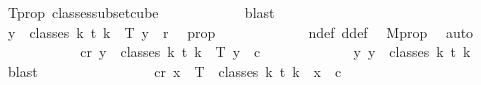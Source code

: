 \begin{isabellebody}
\ T{\isacharunderscore}{\kern0pt}prop\ classes{\isacharunderscore}{\kern0pt}subset{\isacharunderscore}{\kern0pt}cube\isanewline
\ \ \ \ \ \ \ \ \ \ \isamarkupfalse%
\ blast\isanewline
\ \ \ \ \ \ \ \ \isamarkupfalse%
\ \isamarkupfalse%
\ {\isachardoublequoteopen}{\isasymforall}y\ {\isasymin}\ classes\ {\isacharparenleft}{\kern0pt}k{\isacharplus}{\kern0pt}{}{\isacharparenright}{\kern0pt}\ t\ {\isacharparenleft}{\kern0pt}k{\isacharplus}{\kern0pt}{}{\isacharparenright}{\kern0pt}{\isachardot}{\kern0pt}\ {\isasymchi}\ {\isacharparenleft}{\kern0pt}T\ y{\isacharparenright}{\kern0pt}\ {\isacharless}{\kern0pt}\ r{\isachardoublequoteclose}\ \isamarkupfalse%
\ {\isasymchi}{\isacharunderscore}{\kern0pt}prop\ \isanewline
\ \ \ \ \ \ \ \ \ \ \isamarkupfalse%
\ n{\isacharunderscore}{\kern0pt}def\ d{\isacharunderscore}{\kern0pt}def\ \isamarkupfalse%
\ M{\isacharprime}{\kern0pt}{\isacharunderscore}{\kern0pt}prop\ \isamarkupfalse%
\ auto\ \isanewline
\ \ \ \ \ \ \ \ \isamarkupfalse%
\ \isamarkupfalse%
\ {\isachardoublequoteopen}{\isasymexists}c{\isacharless}{\kern0pt}r{\isachardot}{\kern0pt}\ {\isasymforall}y\ {\isasymin}\ classes\ {\isacharparenleft}{\kern0pt}k{\isacharplus}{\kern0pt}{}{\isacharparenright}{\kern0pt}\ t\ {\isacharparenleft}{\kern0pt}k{\isacharplus}{\kern0pt}{}{\isacharparenright}{\kern0pt}{\isachardot}{\kern0pt}\ {\isasymchi}\ {\isacharparenleft}{\kern0pt}T\ y{\isacharparenright}{\kern0pt}\ {\isacharequal}{\kern0pt}\ c{\isachardoublequoteclose}\ \isanewline
\ \ \ \ \ \ \ \ \ \ \isamarkupfalse%
\ {\isacartoucheopen}{\isasymexists}{\isacharbang}{\kern0pt}y{\isachardot}{\kern0pt}\ y\ {\isasymin}\ classes\ {\isacharparenleft}{\kern0pt}k{\isacharplus}{\kern0pt}{}{\isacharparenright}{\kern0pt}\ t\ {\isacharparenleft}{\kern0pt}k{\isacharplus}{\kern0pt}{}{\isacharparenright}{\kern0pt}{\isacartoucheclose}\ \isamarkupfalse%
\ blast\isanewline
\ \ \ \ \ \ \isamarkupfalse%
\isanewline
\ \ \ \ \ \ \isamarkupfalse%
\ \isamarkupfalse%
\ {\isachardoublequoteopen}{\isasymexists}c{\isacharless}{\kern0pt}r{\isachardot}{\kern0pt}\ {\isasymforall}x\ {\isasymin}\ T\ {\isacharbackquote}{\kern0pt}\ classes\ {\isacharparenleft}{\kern0pt}k{\isacharplus}{\kern0pt}{}{\isacharparenright}{\kern0pt}\ t\ {\isacharparenleft}{\kern0pt}k{\isacharplus}{\kern0pt}{}{\isacharparenright}{\kern0pt}{\isachardot}{\kern0pt}\ {\isasymchi}\ x\ {\isacharequal}{\kern0pt}\ c{\isachardoublequoteclose}\ \isamarkupfalse%

\end{isabellebody}
